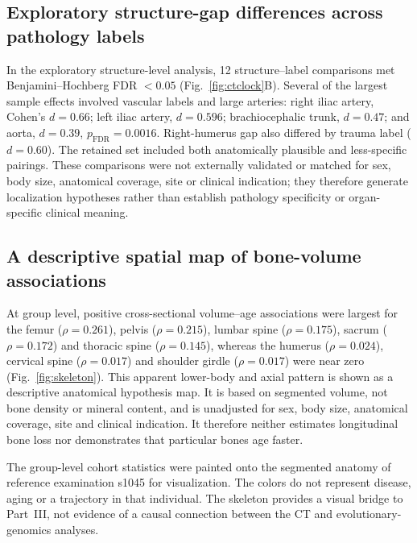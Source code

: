 \documentclass[11pt]{article}
\begin{document}
\subsection{Exploratory structure-gap differences across pathology labels}

In the exploratory structure-level analysis, \num{12} structure--label
comparisons met Benjamini--Hochberg FDR $<\num{0.05}$
(Fig.~\ref{fig:ctclock}B). Several of the largest sample effects involved
vascular labels and large arteries: right iliac artery, Cohen's
$d=\num{0.66}$; left iliac artery, $d=\num{0.596}$; brachiocephalic trunk,
$d=\num{0.47}$; and aorta, $d=\num{0.39}$,
$p_{\mathrm{FDR}}=\num{0.0016}$. Right-humerus gap also differed by trauma
label ($d=\num{0.60}$). The retained set included both anatomically plausible
and less-specific pairings. These comparisons were not externally validated
or matched for sex, body size, anatomical coverage, site or clinical
indication; they therefore generate localization hypotheses rather than
establish pathology specificity or organ-specific clinical meaning.

\subsection{A descriptive spatial map of bone-volume associations}

At group level, positive cross-sectional volume--age associations were largest
for the femur ($\rho=\num{0.261}$), pelvis ($\rho=\num{0.215}$), lumbar spine
($\rho=\num{0.175}$), sacrum ($\rho=\num{0.172}$) and thoracic spine
($\rho=\num{0.145}$), whereas the humerus ($\rho=\num{0.024}$), cervical spine
($\rho=\num{0.017}$) and shoulder girdle ($\rho=\num{0.017}$) were near zero
(Fig.~\ref{fig:skeleton}). This apparent lower-body and axial pattern is shown
as a descriptive anatomical hypothesis map. It is based on segmented volume,
not bone density or mineral content, and is unadjusted for sex, body size,
anatomical coverage, site and clinical indication. It therefore neither
estimates longitudinal bone loss nor demonstrates that particular bones age
faster.

The group-level cohort statistics were painted onto the segmented anatomy of
reference examination s1045 for visualization. The colors do not represent
disease, aging or a trajectory in that individual. The skeleton provides a
visual bridge to Part~III, not evidence of a causal connection between the CT
and evolutionary-genomics analyses.


\newcommand{\figctclock}{figs_full/organ_age_ranking_revised.png}
\newcommand{\figskeleton}{figs_full/fig_skeleton_aging_revised.png}
\end{document}
